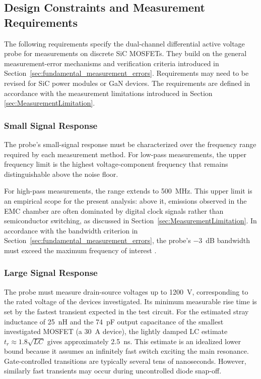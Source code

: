 
\subsection{Design Constraints and Measurement Requirements}
\label{sec:VoltageRequirements}

The following requirements specify the dual-channel differential active voltage probe for measurements on discrete SiC MOSFETs. 
They build on the general measurement-error mechanisms and verification criteria introduced in Section~\ref{sec:fundamental_measurement_errors}. 
Requirements may need to be revised for SiC power modules or GaN devices. 
The requirements are defined in accordance with the measurement limitations introduced in Section \ref{sec:MeasurementLimitation}. 

\subsubsection*{Small Signal Response}
The probe's small-signal response must be characterized over the frequency range required by each measurement method. For low-pass measurements, the upper frequency limit is the highest voltage-component frequency that remains distinguishable above the noise floor. 

For high-pass measurements, the range extends to \SI{500}{MHz}. 
This upper limit is an empirical scope for the present analysis: above it, emissions observed in the EMC chamber are often dominated by digital clock signals rather than semiconductor switching, as discussed in Section~\ref{sec:MeasurementLimitation}. 
In accordance with the bandwidth criterion in Section~\ref{sec:fundamental_measurement_errors}, the probe's \SI{-3}{dB} bandwidth must exceed the maximum frequency of interest .

\subsubsection*{Large Signal Response}
The probe must measure drain-source voltages up to \SI{1200}{V}, corresponding to the rated voltage of the devices investigated. 
Its minimum measurable rise time is set by the fastest transient expected in the test circuit. 
For the estimated stray inductance of \SI{25}{nH} and the \SI{74}{pF} output capacitance of the smallest investigated MOSFET (a \SI{30}{A} device), the lightly damped LC estimate $t_r \approx 1.8\sqrt{LC}$ gives approximately \SI{2.5}{ns}. 
This estimate is an idealized lower bound because it assumes an infinitely fast switch exciting the main resonance. 
Gate-controlled transitions are typically several tens of nanoseconds. 
However, similarly fast transients may occur during uncontrolled diode snap-off. 


